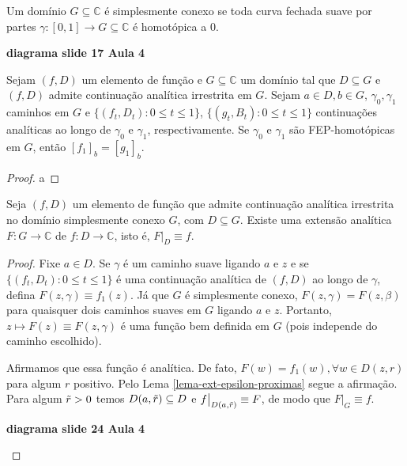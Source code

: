 \begin{definicao}
\label{def-simplesmente-conexo}
Um domínio $G\subseteq\mathbb{C}$ é simplesmente conexo se toda curva fechada
suave por partes $\gamma: [0,1]\to G\subseteq\mathbb{C}$ é homotópica a 0.

\begin{center}
    \textbf{diagrama slide 17 Aula 4}
\end{center}

\end{definicao}

\begin{teorema}
\label{teo-monodromia}
Sejam $(f,D)$ um elemento de função e $G\subseteq\mathbb{C}$ um domínio tal que 
$D\subseteq G$ e $(f,D)$ admite continuação analítica irrestrita em $G$. Sejam
$a\in D, b\in G$, $\gamma_0, \gamma_1$ caminhos em $G$ e 
$\{ (f_t, D_t) : 0\leq t\leq 1 \}$, $\{ (g_t, B_t) : 0\leq t\leq 1 \}$ continuações
analíticas ao longo de $\gamma_0$ e $\gamma_1$, respectivamente. 
Se $\gamma_0$ e $\gamma_1$ são FEP-homotópicas em $G$, então $[f_1]_b = [g_1]_b$.
\end{teorema}

\begin{proof}
a
\end{proof}

\begin{corolario}
Seja $(f,D)$ um elemento de função que admite continuação analítica irrestrita no
domínio simplesmente conexo $G$, com $D\subseteq G$. Existe uma extensão analítica
$F:G\to\mathbb{C}$ de $f:D\to\mathbb{C}$, isto é, $F\big|_D \equiv f$.
\end{corolario}

\begin{proof}
Fixe $a\in D$. Se $\gamma$ é um caminho suave ligando $a$ e $z$ e se 
$\{ (f_t, D_t) : 0\leq t\leq 1 \}$ é uma continuação analítica de $(f,D)$ ao longo de
$\gamma$, defina $F(z, \gamma) \equiv f_1(z)$. Já que $G$ é simplesmente conexo,
$F(z, \gamma) = F(z,\beta)$ para quaisquer dois caminhos suaves em $G$ ligando $a$ e $z$.
Portanto, $z\mapsto F(z)\equiv F(z, \gamma)$ é uma função bem definida em $G$ 
(pois independe do caminho escolhido).

Afirmamos que essa função é analítica. De fato, $F(w) = f_1(w), \forall w\in D(z,r)$
para algum $r$ positivo. Pelo Lema \ref{lema-ext-epsilon-proximas} segue a afirmação.
Para algum $\Tilde{r}>0$ temos $D(a, \Tilde{r}) \subseteq D$ e 
$f\big|_{D(a, \Tilde{r})} \equiv F$, de modo que $F\big|_G \equiv f$.

\begin{center}
    \textbf{diagrama slide 24 Aula 4}
\end{center}

\end{proof}
















